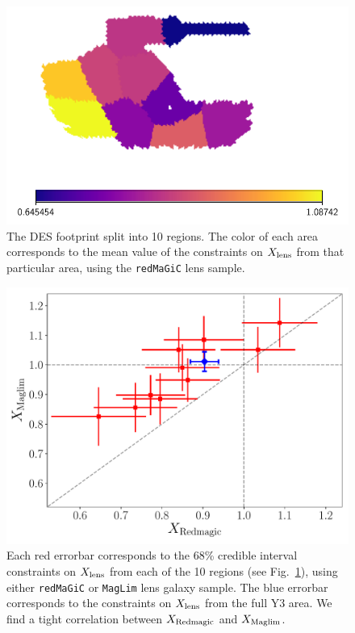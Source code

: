 \documentclass[aps, prd,twocolumn,superscriptaddress,nofootinbib,preprintnumbers]{revtex4-1}
\newcommand{\redmagic}{\texttt{redMaGiC} }
\newcommand{\maglim}{\texttt{MagLim} }
\begin{document}
\begin{figure}
\includegraphics[width=\columnwidth]{figs/X_rm_area_split.pdf}
\caption[]{The DES footprint split into 10 regions. The color of each area corresponds to the mean value of the constraints on $X_{\rm lens}$ from that particular area, using the \redmagic lens sample. }
\label{fig:Xlens_area_split}
\end{figure}

\begin{figure}
\includegraphics[width=\columnwidth]{figs/X_rm_mag_area_scatter.pdf}
\caption[]{Each red errorbar corresponds to the 68\% credible interval constraints on  $X_{\rm lens}$ from each of the 10 regions (see Fig.~\ref{fig:Xlens_area_split}), using either \redmagic or \maglim lens galaxy sample. The blue errorbar corresponds to the constraints on $X_{\rm lens}$ from the full Y3 area. We find a tight correlation between $X_{\rm Redmagic}$ and $X_{\rm Maglim}$. }
\label{fig:Xrm_mag_scatter}
\end{figure}
\end{document}
